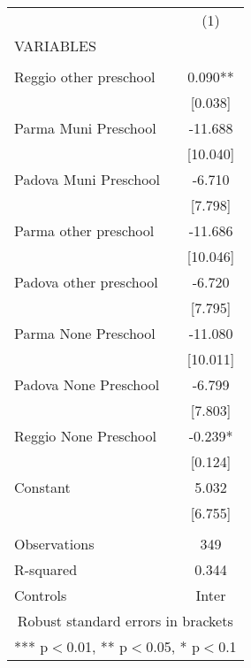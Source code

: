 \begin{tabular}{lc} \hline
 & (1) \\
VARIABLES &  \\ \hline
 &  \\
Reggio other preschool & 0.090** \\
 & [0.038] \\
Parma Muni Preschool & -11.688 \\
 & [10.040] \\
Padova Muni Preschool & -6.710 \\
 & [7.798] \\
Parma other preschool & -11.686 \\
 & [10.046] \\
Padova other preschool & -6.720 \\
 & [7.795] \\
Parma None Preschool & -11.080 \\
 & [10.011] \\
Padova None Preschool & -6.799 \\
 & [7.803] \\
Reggio None Preschool & -0.239* \\
 & [0.124] \\
Constant & 5.032 \\
 & [6.755] \\
 &  \\
Observations & 349 \\
R-squared & 0.344 \\
 Controls & Inter \\ \hline
\multicolumn{2}{c}{ Robust standard errors in brackets} \\
\multicolumn{2}{c}{ *** p$<$0.01, ** p$<$0.05, * p$<$0.1} \\
\end{tabular}
